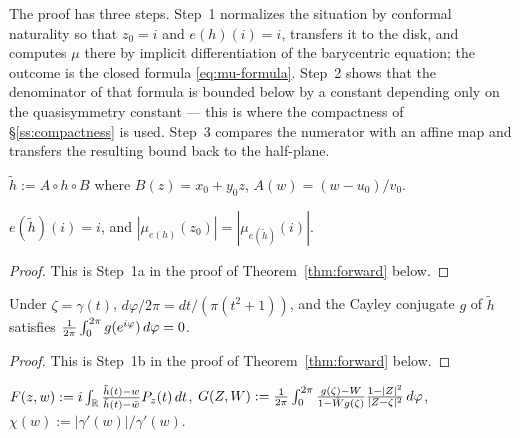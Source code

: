 The proof has three steps. Step~1 normalizes the situation by conformal
naturality so that $z_0=i$ and $e(h)(i)=i$, transfers it to the disk, and
computes $\mu$ there by implicit differentiation of the barycentric equation;
the outcome is the closed formula \eqref{eq:mu-formula}. Step~2 shows that the
denominator of that formula is bounded below by a constant depending only on
the quasisymmetry constant --- this is where the compactness of
\S\ref{ss:compactness} is used. Step~3 compares the numerator with an affine
map and transfers the resulting bound back to the half-plane.

\begin{definition}[Normalization at $z_0$]\label{def:normalizeAt}
	$\tilde h:=A\circ h\circ B$ where $B(z)=x_0+y_0z$, $A(w)=(w-u_0)/v_0$.
\end{definition}

\begin{lemma}\label{lem:normalizeAt_fixes_I}
	$e(\tilde h)(i)=i$, and $|\mu_{e(h)}(z_0)|=|\mu_{e(\tilde h)}(i)|$.
\end{lemma}
\begin{proof}
	This is Step~1a in the proof of Theorem~\ref{thm:forward} below.
\end{proof}

\begin{lemma}\label{lem:circleAvg_eq_zero_of_normalized}
	Under $\zeta=\gamma(t)$, $d\varphi/2\pi=dt/(\pi(t^2+1))$, and the Cayley conjugate $g$ of $\tilde h$ satisfies $\frac{1}{2\pi}\int_0^{2\pi} g(e^{i\varphi}) \,d\varphi=0$.
\end{lemma}
\begin{proof}
	This is Step~1b in the proof of Theorem~\ref{thm:forward} below.
\end{proof}

\begin{definition}\label{def:baryFnUHP}
	$F(z,w):=i\int_{\mathbb{R}}\frac{\tilde h(t)-w}{\tilde h(t)-\bar w}P_z(t)\,dt$, $G(Z,W):=\frac{1}{2\pi}\int_0^{2\pi} \frac{g(\zeta)-W}{1-\bar Wg(\zeta)}\frac{1-|Z|^2}{|Z-\zeta|^2} \,d\varphi$, $\chi(w):=|\gamma'(w)|/\gamma'(w)$.
\end{definition}

